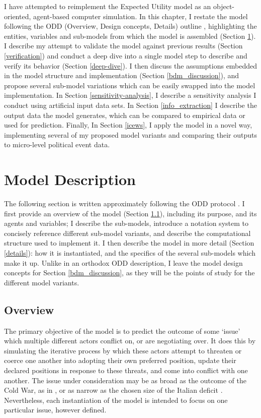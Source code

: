 I have attempted to reimplement the Expected Utility model as an object-oriented, agent-based computer simulation. In this chapter, I restate the model following the ODD (Overview, Design concepts, Details) outline \citep{grimm_2006}, highlighting the entities, variables and sub-models from which the model is assembled (Section \ref{model_description}). I describe my attempt to validate the model against previous results (Section \ref{verification}) and conduct a deep dive into a single model step to describe and verify its behavior (Section \ref{deep-dive}). I then discuss the assumptions embedded in the model structure and implementation (Section \ref{bdm_discussion}), and propose several sub-model variations which can be easily swapped into the model implementation. In Section \ref{sensitivity-analysis}, I describe a sensitivity analysis I conduct using artificial input data sets. In Section \ref{info_extraction} I describe the output data the model generates, which can be compared to empirical data or used for prediction. Finally, In Section \ref{icews}, I apply the model in a novel way, implementing several of my proposed model variants and comparing their outputs to micro-level political event data.

\section{Model Description} \label{model_description}

The following section is written approximately following the ODD protocol \citep{grimm_2006}. I first provide an overview of the model (Section \ref{overview}), including its purpose, and its agents and variables; I describe the sub-models, introduce a notation system to concisely reference different sub-model variants, and describe the computational structure used to implement it. I then describe the model in more detail (Section \ref{details}): how it is instantiated, and the specifics of the several sub-models which make it up. Unlike in an orthodox ODD description, I leave the model design concepts for Section \ref{bdm_discussion}, as they will be the points of study for the different model variants.

\subsection{Overview} \label{overview}


The primary objective of the model is to predict the outcome of some `issue' which multiple different actors conflict on, or are negotiating over. It does this by simulating the iterative process by which these actors attempt to threaten or coerce one another into adopting their own preferred position, update their declared positions in response to these threats, and come into conflict with one another. The issue under consideration may be as broad as the outcome of the Cold War, as in \citet{bdm_1998}, or as narrow as the chosen size of the Italian deficit \citep{feder_1992}. Nevertheless, each instantiation of the model is intended to focus on one particular issue, however defined.


